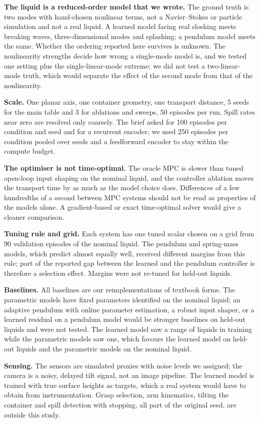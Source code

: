 \textbf{The liquid is a reduced-order model that we wrote.} The ground truth is two modes with hand-chosen nonlinear terms, not a Navier--Stokes or particle simulation and not a real liquid. A learned model facing real sloshing meets breaking waves, three-dimensional modes and splashing; a pendulum model meets the same. Whether the ordering reported here survives is unknown. The nonlinearity strengths decide how wrong a single-mode model is, and we tested one setting plus the single-linear-mode extreme; we did not test a two-linear-mode truth, which would separate the effect of the second mode from that of the nonlinearity.

\textbf{Scale.} One planar axis, one container geometry, one transport distance, 5 seeds for the main table and 3 for ablations and sweeps, 50 episodes per run. Spill rates near zero are resolved only coarsely. The brief asked for 100 episodes per condition and seed and for a recurrent encoder; we used 250 episodes per condition pooled over seeds and a feedforward encoder to stay within the compute budget.

\textbf{The optimiser is not time-optimal.} The oracle MPC is slower than tuned open-loop input shaping on the nominal liquid, and the controller ablation moves the transport time by as much as the model choice does. Differences of a few hundredths of a second between MPC systems should not be read as properties of the models alone. A gradient-based or exact time-optimal solver would give a cleaner comparison.

\textbf{Tuning rule and grid.} Each system has one tuned scalar chosen on a grid from 90 validation episodes of the nominal liquid. The pendulum and spring-mass models, which predict almost equally well, received different margins from this rule; part of the reported gap between the learned and the pendulum controller is therefore a selection effect. Margins were not re-tuned for held-out liquids.

\textbf{Baselines.} All baselines are our reimplementations of textbook forms. The parametric models have fixed parameters identified on the nominal liquid; an adaptive pendulum with online parameter estimation, a robust input shaper, or a learned residual on a pendulum model would be stronger baselines on held-out liquids and were not tested. The learned model saw a range of liquids in training while the parametric models saw one, which favours the learned model on held-out liquids and the parametric models on the nominal liquid.

\textbf{Sensing.} The sensors are simulated proxies with noise levels we assigned; the camera is a noisy, delayed tilt signal, not an image pipeline. The learned model is trained with true surface heights as targets, which a real system would have to obtain from instrumentation. Grasp selection, arm kinematics, tilting the container and spill detection with stopping, all part of the original seed, are outside this study.
